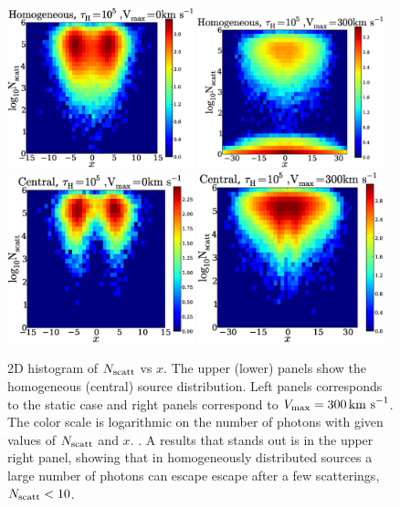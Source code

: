 \documentclass{emulateapj}
\newcommand{\kms}{{\ifmmode{{\mathrm{\,km\ s}^{-1}}}\else{\,km~s$^{-1}$}\fi}}
\begin{document}
\begin{figure}
\begin{center}
  \includegraphics[width=0.48\textwidth]{f5_1.eps}
  \includegraphics[width=0.48\textwidth]{f5_2.eps}
  \includegraphics[width=0.48\textwidth]{f5_3.eps}
  \includegraphics[width=0.48\textwidth]{f5_4.eps}    
\end{center}
    \caption{2D histogram of $N_{\rm scatt}$ vs $x$. The upper (lower) panels
      show the homogeneous (central) source distribution. Left panels 
      corresponds to the static case and right panels correspond to
      $V_{\rm max}=300\kms$. The color scale is logarithmic on the
      number of photons with given values of $N_{\rm scatt}$ and
      $x$. \label{fig:Nscatt2D}. A results that stands out is in the upper
      right panel, showing that in homogeneously distributed sources a
      large number of photons can escape escape after a few
      scatterings, $N_{\rm scatt}<10$.}   
\end{figure}
\end{document}
